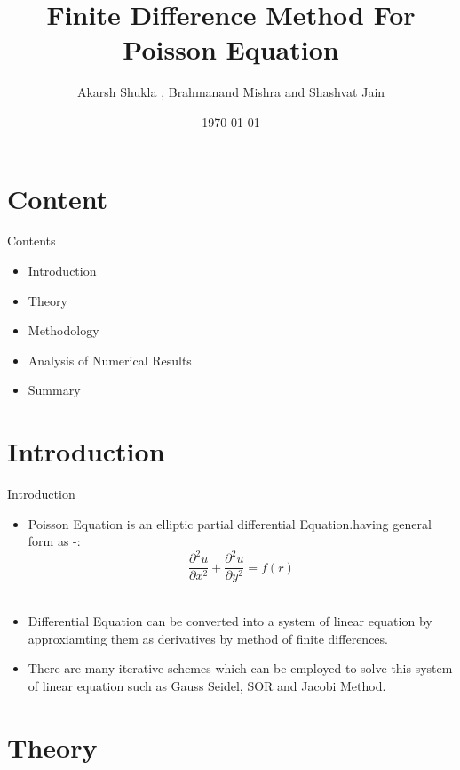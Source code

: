 \documentclass[8pt]{beamer}
\title{Finite Difference Method For Poisson Equation}
\date{\today}
\author{Akarsh Shukla , Brahmanand Mishra and Shashvat Jain}
\begin{document}
\maketitle

\section{Content}
\begin{frame}{Contents}

\begin{itemize}
\item Introduction 
\item Theory
\item Methodology
\item Analysis of Numerical Results
\item Summary 
\end{itemize}

\end{frame}

\section{Introduction}
\begin{frame}{Introduction}
	\begin{itemize}
		\item  Poisson Equation is an elliptic partial differential Equation.having general form as -: \\
	 \[  
		\frac{\partial^2 u}{\partial x^2} + \frac{\partial^2 u}{\partial y^2} =  f({r})
		\] \\
		\item Differential Equation can be converted into a system of linear equation by approxiamting them as derivatives by method of finite differences.
		\item There are many iterative schemes which can be employed to solve this system of linear equation such as Gauss Seidel, SOR and Jacobi Method.
		
		
	\end{itemize}
  
   
\end{frame}

\section{Theory}
\end{document}

